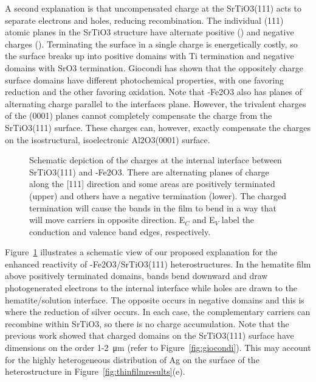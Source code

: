 \documentclass[12pt,%
              twoside,
               letterpaper]{uiothesis}
\begin{document}
A second explanation is that uncompensated charge at the SrTiO3(111) acts to separate
electrons and holes, reducing recombination.  The individual (111) atomic planes in the
SrTiO3 structure have alternate positive () and negative charges
().  Terminating the surface in a single charge is energetically costly, so
the surface breaks up into positive domains with Ti termination and negative domains with
SrO3 termination.  Giocondi\cite{Giocondi:2003wc} has shown that the oppositely
charge surface domains have different photochemical properties, with one favoring
reduction and the other favoring oxidation.  Note that \textalpha-Fe2O3 also has
planes of alternating charge parallel to the interfaces plane.  However, the trivalent
charges of the (0001) planes cannot completely compensate the charge from the
SrTiO3(111) surface.  These charges can, however, exactly compensate the charges on
the isostructural, isoelectronic Al2O3(0001) surface.
\begin{figure}
\begin{center}
\caption[Charges at internal interface between SrTiO3 and Fe2O3]{%
		Schematic depiction of the charges at the internal interface 
		between SrTiO3(111) and \textalpha-Fe2O3. There are 
		alternating planes of charge along the [111] direction and some 
		areas are positively terminated (upper) and others have a negative 
		termination (lower). The charged termination will cause the bands 
		in the film to bend in a way that will move carriers in opposite 
		direction. E$_C$ and E$_V$ label the conduction and valence band 
		edges, respectively.}
\label{fig:polarterms}
\end{center}
\end{figure}
Figure~\ref{fig:polarterms} illustrates a schematic view of our proposed explanation for the
enhanced reactivity of \textalpha-Fe2O3/SrTiO3(111) heterostructures. In the
hematite film above positively terminated domains, bands bend downward and draw
photogenerated electrons to the internal interface while holes are drawn to the
hematite/solution interface.  The opposite occurs in negative domains and this is where
the reduction of silver occurs.  In each case, the complementary carriers can recombine
within SrTiO3, so there is no charge accumulation.  Note that the previous work
showed that charged domains on the SrTiO3(111) surface have dimensions on the order
1-2~\si{\micro\meter} (refer to Figure~\ref{fig:giocondi}).  This may account for the highly
heterogeneous distribution of Ag on the surface of the heterostructure in
Figure~\ref{fig:thinfilmresults}(e).
\end{document}
